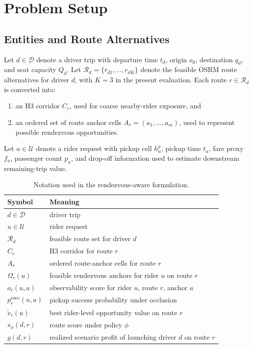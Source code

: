 \documentclass[journal]{IEEEtran}
\begin{document}
\section{Problem Setup}
\subsection{Entities and Route Alternatives}
Let $d \in \mathcal{D}$ denote a driver trip with departure time $t_d$, origin $o_d$, destination $q_d$, and seat capacity $Q_d$. Let $\mathcal{R}_d = \{r_{d1}, \ldots, r_{dK}\}$ denote the feasible OSRM route alternatives for driver $d$, with $K=3$ in the present evaluation. Each route $r \in \mathcal{R}_d$ is converted into:
\begin{enumerate}
\item an H3 corridor $C_r$, used for coarse nearby-rider exposure, and
\item an ordered set of route anchor cells $A_r = (a_1, \ldots, a_m)$, used to represent possible rendezvous opportunities.
\end{enumerate}

Let $u \in \mathcal{U}$ denote a rider request with pickup cell $h_u^p$, pickup time $t_u$, fare proxy $f_u$, passenger count $p_u$, and drop-off information used to estimate downstream remaining-trip value.

\begin{table}[t]
\caption{Notation used in the rendezvous-aware formulation.}
\label{tab:notation}
\centering
\footnotesize
\begin{tabularx}{\columnwidth}{L{0.27\columnwidth}Y}
\toprule
Symbol & Meaning \\
\midrule
$d \in \mathcal{D}$ & driver trip \\
$u \in \mathcal{U}$ & rider request \\
$\mathcal{R}_d$ & feasible route set for driver $d$ \\
$C_r$ & H3 corridor for route $r$ \\
$A_r$ & ordered route-anchor cells for route $r$ \\
$\Omega_r(u)$ & feasible rendezvous anchors for rider $u$ on route $r$ \\
$o_r(u,a)$ & observability score for rider $u$, route $r$, anchor $a$ \\
$p_r^{\mathrm{succ}}(u,a)$ & pickup success probability under occlusion \\
$\tilde v_r(u)$ & best rider-level opportunity value on route $r$ \\
$s_\phi(d,r)$ & route score under policy $\phi$ \\
$g(d,r)$ & realized scenario profit of launching driver $d$ on route $r$ \\
\bottomrule
\end{tabularx}
\end{table}
\end{document}
